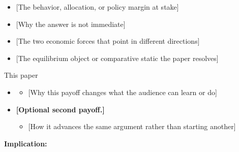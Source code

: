 \documentclass[11pt, aspectratio=169]{beamer}
\title[\PaperShortTitle]{\PaperTitle}
\author[\AuthorShort]{\TitleAuthorBlock}
\institute{\TitleAffiliationBlock}
\date[\VenueShort]{\VenueDate}
\begin{document}
\begin{frame}[plain]
  \titlepage
\end{frame}
\addtocounter{framenumber}{-1}

\begin{frame}[t]{\KeyQuestion}
  \medskip
  \begin{itemize}\setlength{\itemsep}{0.55em}
    \item {[The behavior, allocation, or policy margin at stake]}
    \item {[Why the answer is not immediate]}
  \end{itemize}

  \medskip
  \begin{itemize}\setlength{\itemsep}{0.55em}
    \item {[The two economic forces that point in different directions]}
    \item {[The equilibrium object or comparative static the paper resolves]}
  \end{itemize}
  \medskip
\end{frame}

\begin{frame}{This paper}
  \begin{itemize}\setlength{\itemsep}{0.82em}
    \item {} \ResultHeadlineSlide
      \begin{itemize}
        \item {[Why this payoff changes what the audience can learn or do]}
      \end{itemize}
    \item \textbf{[Optional second payoff.]} \ResultSupportSlide
      \begin{itemize}
        \item {[How it advances the same argument rather than starting another]}
      \end{itemize}
  \end{itemize}

  \medskip
  \textbf{Implication:} \ResultImplicationSlide
\end{frame}
\end{document}
